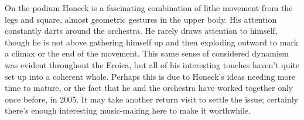 On the podium Honeck is a fascinating combination of lithe movement from the legs and square, almost geometric gestures in the upper body. His attention constantly darts around the orchestra. He rarely draws attention to himself, though he is not above gathering himself up and then exploding outward to mark a climax or the end of the movement. This same sense of considered dynamism was evident throughout the Eroica, but all of his interesting touches haven’t quite set up into a coherent whole. Perhaps this is due to Honeck’s ideas needing more time to mature, or the fact that he and the orchestra have worked together only once before, in 2005. It may take another return visit to settle the issue; certainly there’s enough interesting music-making here to make it worthwhile.
